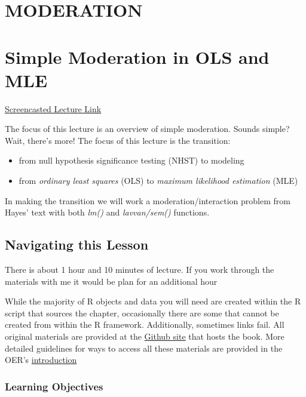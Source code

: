 \documentclass[
  11pt,
]{book}
\providecommand{\tightlist}{%
  \setlength{\itemsep}{0pt}\setlength{\parskip}{0pt}}
\begin{document}
\hypertarget{MOD}{%
\chapter*{MODERATION}\label{MOD}}


\hypertarget{SimpMod}{%
\chapter{Simple Moderation in OLS and MLE}\label{SimpMod}}

\href{https://spu.hosted.panopto.com/Panopto/Pages/Viewer.aspx?pid=cc098142-3693-4366-bb55-ad1d0175414e}{Screencasted Lecture Link}

The focus of this lecture is an overview of simple moderation. Sounds simple? Wait, there's more! The focus of this lecture is the transition:

\begin{itemize}
\tightlist
\item
  from null hypothesis significance testing (NHST) to modeling
\item
  from \emph{ordinary least squares} (OLS) to \emph{maximum likelihood estimation} (MLE)
\end{itemize}

In making the transition we will work a moderation/interaction problem from Hayes' text with both \emph{lm()} and \emph{lavvan/sem()} functions.

\hypertarget{navigating-this-lesson-6}{%
\section{Navigating this Lesson}\label{navigating-this-lesson-6}}

There is about 1 hour and 10 minutes of lecture. If you work through the materials with me it would be plan for an additional hour

While the majority of R objects and data you will need are created within the R script that sources the chapter, occasionally there are some that cannot be created from within the R framework. Additionally, sometimes links fail. All original materials are provided at the \href{https://github.com/lhbikos/ReC_MultivModel}{Github site} that hosts the book. More detailed guidelines for ways to access all these materials are provided in the OER's \protect\hyperlink{ReCintro}{introduction}

\hypertarget{learning-objectives-6}{%
\subsection{Learning Objectives}\label{learning-objectives-6}}
\end{document}

